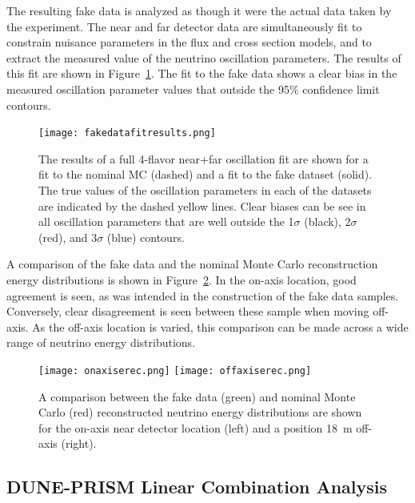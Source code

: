 The resulting fake data is analyzed as though it were the actual data taken by the experiment. The near and far detector data are simultaneously fit to constrain nuisance parameters in the flux and cross section models, and to extract the measured value of the neutrino oscillation parameters. The results of this fit are shown in Figure~\ref{fig:duneprismfit}. The fit to the fake data shows a clear bias in the measured oscillation parameter values that outside the 95\% confidence limit contours.

\begin{figure}[h!]
   \begin{center}
      \texttt{[image: fakedatafitresults.png]}
      \caption{The results of a full 4-flavor near+far oscillation fit are shown for a fit to the nominal MC (dashed) and a fit to the fake dataset (solid). The true values of the oscillation parameters in each of the datasets are indicated by the dashed yellow lines. Clear biases can be see in all oscillation parameters that are well outside the 1$\sigma$ (black), 2$\sigma$ (red), and 3$\sigma$ (blue) contours.}
      \label{fig:duneprismfit}
   \end{center}
\end{figure}

A comparison of the fake data and the nominal Monte Carlo reconstruction energy distributions is shown in Figure~\ref{fig:duneprismerec}. In the on-axis location, good agreement is seen, as was intended in the construction of the fake data samples. Conversely, clear disagreement is seen between these sample when moving off-axis. As the off-axis location is varied, this comparison can be made across a wide range of neutrino energy distributions.

\begin{figure}[h!]
   \begin{center}
      \texttt{[image: onaxiserec.png]}
      \texttt{[image: offaxiserec.png]}
      \caption{A comparison between the fake data (green) and nominal Monte Carlo (red) reconstructed neutrino energy distributions are shown for the on-axis near detector location (left) and a position 18~m off-axis (right).}
      \label{fig:duneprismerec}
   \end{center}
\end{figure}

\subsection{DUNE-PRISM Linear Combination Analysis}

